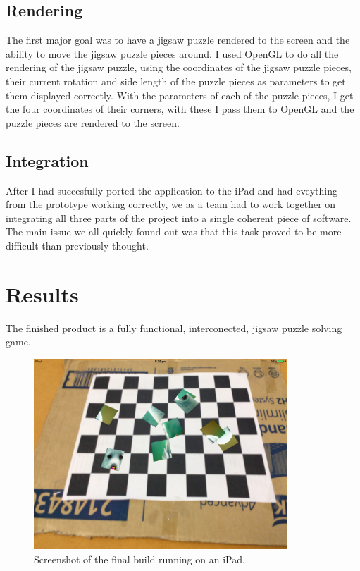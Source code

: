 \documentclass{article}
\begin{document}
\subsection{Rendering}
The first major goal was to have a jigsaw puzzle rendered to the screen and the ability to move the jigsaw puzzle pieces around. I used OpenGL to do all the rendering of the jigsaw puzzle, using the coordinates of the jigsaw puzzle pieces, their current rotation and side length of the puzzle pieces as parameters to get them displayed correctly. With the parameters of each of the puzzle pieces, I get the four coordinates of their corners, with these I pass them to OpenGL and the puzzle pieces are rendered to the screen.

\subsection{Integration}
After I had succesfully ported the application to the iPad and had eveything from the prototype working correctly, we as a team had to work together on integrating all three parts of the project into a single coherent piece of software. The main issue we all quickly found out was that this task proved to be more difficult than previously thought. 


\section{Results}
The finished product is a fully functional, interconected, jigsaw puzzle solving game.

\begin{figure}[ht]
\begin{center}
\includegraphics[width=0.85\textwidth]{images/iPadFinalImage}
\caption{Screenshot of the final build running on an iPad.}
\label{fig:iPadFinal}
\end{center}
\end{figure}
\end{document}

